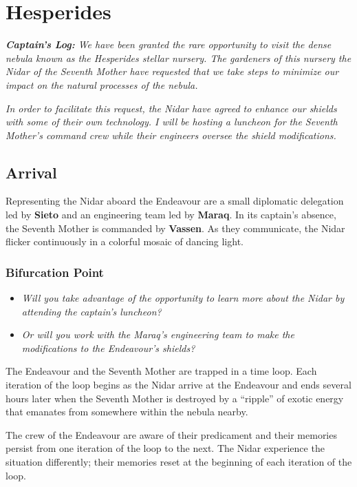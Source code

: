 \documentclass[11pt, a5paper, parskip=half-, DIV=12]{scrartcl}
\begin{document}
\section*{Hesperides}
\textit{\textbf{Captain's Log:} We have been granted the rare opportunity to visit the dense nebula known as the Hesperides stellar nursery. The gardeners of this nursery \textemdash{} the Nidar of the Seventh Mother \textemdash{} have requested that we take steps to minimize our impact on the natural processes of the nebula.}

\textit{In order to facilitate this request, the Nidar have agreed to enhance our shields with some of their own technology. I will be hosting a luncheon for the Seventh Mother's command crew while their engineers oversee the shield modifications.}

\subsection*{Arrival}
Representing the Nidar aboard the Endeavour are a small diplomatic delegation led by \textbf{Sieto} and an engineering team led by \textbf{Maraq}.
In its captain's absence, the Seventh Mother is commanded by \textbf{Vassen}.
As they communicate, the Nidar flicker continuously in a colorful mosaic of dancing light.
\subsubsection*{Bifurcation Point}
\begin{itemize}
	\item \textit{Will you take advantage of the opportunity to learn more about the Nidar by attending the captain's luncheon?} 
	\item \textit{Or will you work with the Maraq's engineering team to make the modifications to the Endeavour's shields?} 
\end{itemize}

The Endeavour and the Seventh Mother are trapped in a time loop. Each iteration of the loop begins as the Nidar arrive at the Endeavour and ends several hours later when the Seventh Mother is destroyed by a ``ripple'' of exotic energy that emanates from somewhere within the nebula nearby.

The crew of the Endeavour are aware of their predicament and their memories persist from one iteration of the loop to the next.  The Nidar experience the situation differently; their memories reset at the beginning of each iteration of the loop.
\end{document}
